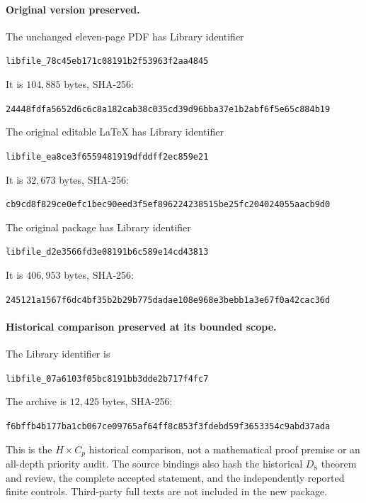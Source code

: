 \documentclass[11pt,letterpaper]{article}
\theoremstyle{definition}\newtheorem{definition}{Definition}
\newcommand{\hash}[1]{{\small\ttfamily\nolinkurl{#1}}}
\begin{document}
\paragraph{Original version preserved.}
The unchanged eleven-page PDF has Library identifier\begin{center}\hash{libfile_78c45eb171c08191b2f53963f2aa4845}\end{center}It is $104{,}885$ bytes, SHA-256:
\begin{center}\hash{24448fdfa5652d6c6c8a182cab38c035cd39d96bba37e1b2abf6f5e65c884b19}\end{center}
The original editable LaTeX has Library identifier\begin{center}\hash{libfile_ea8ce3f6559481919dfddff2ec859e21}\end{center}It is $32{,}673$ bytes, SHA-256:
\begin{center}\hash{cb9cd8f829ce0efc1bec90eed3f5ef896224238515be25fc204024055aacb9d0}\end{center}
The original package has Library identifier\begin{center}\hash{libfile_d2e3566fd3e08191b6c589e14cd43813}\end{center}It is $406{,}953$ bytes, SHA-256:
\begin{center}\hash{245121a1567f6dc4bf35b2b29b775dadae108e968e3bebb1a3e67f0a42cac36d}\end{center}

\paragraph{Historical comparison preserved at its bounded scope.}
The Library identifier is\begin{center}\hash{libfile_07a6103f05bc8191bb3dde2b717f4fc7}\end{center}The archive is $12{,}425$ bytes, SHA-256:
\begin{center}\hash{f6bffb4b177ba1cb067ce09765af64ff8c853f3fdebd59f3653354c9abd37ada}\end{center}
This is the $H\times C_p$ historical comparison, not a mathematical proof premise or an all-depth priority audit. The source bindings also hash the historical $D_8$ theorem and review, the complete accepted statement, and the independently reported finite controls. Third-party full texts are not included in the new package.
\end{document}
